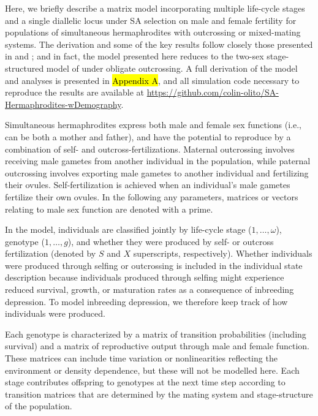 \documentclass[11pt]{article}
\begin{document}
Here, we briefly describe a matrix model incorporating multiple life-cycle stages and a single diallelic locus under SA selection on male and female fertility for populations of simultaneous hermaphrodites with outcrossing or mixed-mating systems. The derivation and some of the key results follow closely those presented in \citet{deVriesCaswell2019a} and \citet{deVriesCaswell2019b}; and in fact, the model presented here reduces to the two-sex stage-structured model of \citet{deVriesCaswell2019b} under obligate outcrossing. A full derivation of the model and analyses is presented in \hl{Appendix A}, and all simulation code necessary to reproduce the results are available at \url{https://github.com/colin-olito/SA-Hermaphrodites-wDemography}.

Simultaneous hermaphrodites express both male and female sex functions (i.e., can be both a mother and father), and have the potential to reproduce by a combination of self- and outcross-fertilizations. Maternal outcrossing involves receiving male gametes from another individual in the population, while paternal outcrossing involves exporting male gametes to another individual and fertilizing their ovules. Self-fertilization is achieved when an individual's male gametes fertilize their own ovules. In the following any parameters, matrices or vectors relating to male sex function are denoted with a prime. 

In the model, individuals are classified jointly by life-cycle stage ($1, \ldots, \omega$), genotype ($1, \ldots, g$), and whether they were produced by self- or outcross fertilization (denoted by $S$ and $X$ superscripts, respectively). Whether individuals were produced through selfing or outcrossing is included in the individual state description because individuals produced through selfing might experience reduced survival, growth, or maturation rates as a consequence of inbreeding depression. To model inbreeding depression, we therefore keep track of how individuals were produced. 

Each genotype is characterized by a matrix of transition probabilities (including survival) and a matrix of reproductive output through male and female function. These matrices can include time variation or nonlinearities reflecting the environment or density dependence, but these will not be modelled here. Each stage contributes offspring to genotypes at the next time step according to transition matrices that are determined by the mating system and stage-structure of the population.
\end{document}
